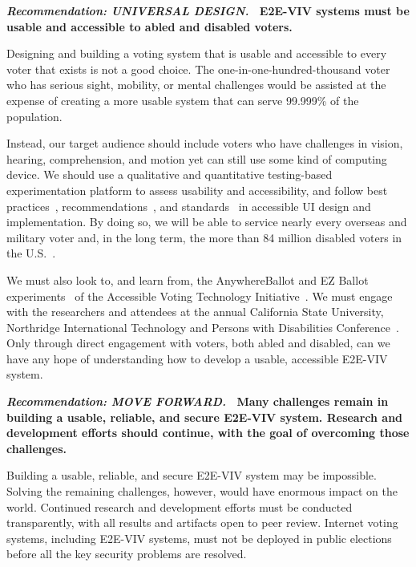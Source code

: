 \vspace{12pt} \textbf{\emph{Recommendation: UNIVERSAL DESIGN.} \
  E2E-VIV systems must be usable and accessible to abled and disabled
  voters.}

Designing and building a voting system that is usable and accessible
to every voter that exists is not a good choice. The
one-in-one-hundred-thousand voter who has serious sight, mobility, or
mental challenges would be assisted at the expense of creating a more
usable system that can serve 99.999\% of the population.

Instead, our target audience should include voters who have challenges
in vision, hearing, comprehension, and motion yet can still use some
kind of computing device. We should use a qualitative and quantitative
testing-based experimentation platform to assess usability and
accessibility, and follow best
practices~\cite{materials-at-elections.itif.org},
recommendations~\cite{WAI,Section508,WAVE}, and
standards~\cite{ADAStandards} in accessible UI design and
implementation. By doing so, we will be able to service nearly every
overseas and military voter and, in the long term, the more than 84
million disabled voters in the U.S.~\cite{CensusData}.

We must also look to, and learn from, the AnywhereBallot and EZ Ballot
experiments~\cite{AnywhereBallot,lee2012ez} of the Accessible Voting
Technology Initiative~\cite{AVTI}.  We must engage with the
researchers and attendees at the annual California State University,
Northridge International Technology and Persons with Disabilities
Conference~\cite{CSUN}. Only through direct engagement with voters,
both abled and disabled, can we have any hope of understanding how to
develop a usable, accessible E2E-VIV system.

\vspace{12pt} 

\textbf{\emph{Recommendation: MOVE FORWARD.} \ Many challenges remain
  in building a usable, reliable, and secure E2E-VIV system. Research
  and development efforts should continue, with the goal of overcoming
  those challenges.}

Building a usable, reliable, and secure E2E-VIV system may be
impossible. Solving the remaining challenges, however, would have
enormous impact on the world. Continued research and development
efforts must be conducted transparently, with all results and
artifacts open to peer review. Internet voting systems, including
E2E-VIV systems, must not be deployed in public elections before all
the key security problems are resolved.

